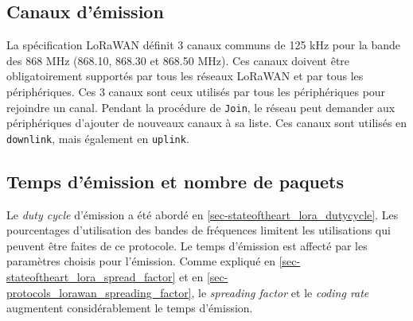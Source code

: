 





\subsection{Canaux d'émission}

La spécification LoRaWAN définit 3 canaux communs de 125 kHz pour la bande des 868 MHz (868.10, 868.30 et 868.50 MHz)\cite{HomeTheT94:online}. Ces canaux doivent être obligatoirement supportés par tous les réseaux LoRaWAN et par tous les périphériques. Ces 3 canaux sont ceux utilisés par tous les périphériques pour rejoindre un canal. Pendant la procédure de \texttt{Join}, le réseau peut demander aux périphériques d'ajouter de nouveaux canaux à sa liste. Ces canaux sont utilisés en \texttt{downlink}, mais également en \texttt{uplink}\cite{HomeTheT94:online}.



\subsection{Temps d'émission et nombre de paquets}

Le \textit{duty cycle} d'émission a été abordé en \cref{sec-stateoftheart_lora_dutycycle}. Les pourcentages d'utilisation des bandes de fréquences limitent les utilisations qui peuvent être faites de ce protocole. Le temps d'émission est affecté par les paramètres choisis pour l'émission. Comme expliqué en \cref{sec-stateoftheart_lora_spread_factor} et en \cref{sec-protocols_lorawan_spreading_factor}, le \textit{spreading factor} et le \textit{coding rate} augmentent considérablement le temps d'émission. 


